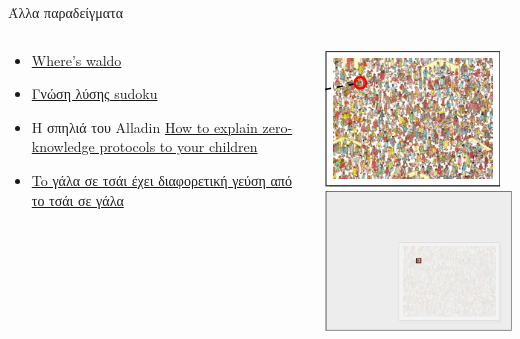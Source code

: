 \documentclass[handout]{beamer}
\begin{document}
\begin{frame}{Άλλα παραδείγματα}

\begin{columns}
\begin{column}{0.5\textwidth}
\begin{itemize}
\item \href{http://www.wisdom.weizmann.ac.il/~naor/PAPERS/waldo.pdf}{Where's waldo} 

\item \href{http://blog.computationalcomplexity.org/2006/08/zero-knowledge-sudoku.html}{Γνώση λύσης sudoku}

\item Η σπηλιά του Alladin
\href{http://pages.cs.wisc.edu/~mkowalcz/628.pdf}{How to explain zero-knowledge protocols to your children}

\item \href{http://web.engr.oregonstate.edu/~rosulekm/pubs/zk-waldo-talk.pdf}{To γάλα σε τσάι έχει διαφορετική γεύση από το τσάι σε γάλα}
\end{itemize}
\end{column} 

\begin{column}{0.5\textwidth}
\includegraphics[width=.8\textwidth]{waldo1.PNG} \\
\includegraphics[width=.8\textwidth]{waldo2.PNG}
\end{column} 

\end{columns}
\end{frame}
\end{document}
